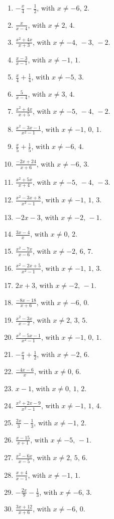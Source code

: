 \documentclass[11pt,oneside]{book}
\begin{document}
\begin{enumerate}[leftmargin=*,label=\textbf{N\arabic*.},itemsep=0.45\baselineskip]
\item $\displaystyle - \frac{x}{4} - \frac{1}{2}$, with $x\ne -6,\,2$.
\item $\displaystyle \frac{x}{x - 4}$, with $x\ne 2,\,4$.
\item $\displaystyle \frac{x^{2} + 4 x}{x + 3}$, with $x\ne -4,\,-3,\,-2$.
\item $\displaystyle \frac{x - 3}{x - 1}$, with $x\ne -1,\,1$.
\item $\displaystyle \frac{x}{4} + \frac{1}{4}$, with $x\ne -5,\,3$.
\item $\displaystyle \frac{5}{x - 4}$, with $x\ne 3,\,4$.
\item $\displaystyle \frac{x^{2} + 4 x}{x + 5}$, with $x\ne -5,\,-4,\,-2$.
\item $\displaystyle \frac{x^{2} - 3 x - 1}{x^{2} - 1}$, with $x\ne -1,\,0,\,1$.
\item $\displaystyle \frac{x}{5} + \frac{1}{5}$, with $x\ne -6,\,4$.
\item $\displaystyle \frac{- 2 x + 24}{x + 6}$, with $x\ne -6,\,3$.
\item $\displaystyle \frac{x^{2} + 5 x}{x + 4}$, with $x\ne -5,\,-4,\,-3$.
\item $\displaystyle \frac{x^{2} - 3 x + 8}{x^{2} - 1}$, with $x\ne -1,\,1,\,3$.
\item $\displaystyle - 2 x - 3$, with $x\ne -2,\,-1$.
\item $\displaystyle \frac{3 x - 4}{x}$, with $x\ne 0,\,2$.
\item $\displaystyle \frac{x^{2} - 7 x}{x - 6}$, with $x\ne -2,\,6,\,7$.
\item $\displaystyle \frac{x^{2} - 2 x + 5}{x^{2} - 1}$, with $x\ne -1,\,1,\,3$.
\item $\displaystyle 2 x + 3$, with $x\ne -2,\,-1$.
\item $\displaystyle \frac{- 8 x - 18}{x + 6}$, with $x\ne -6,\,0$.
\item $\displaystyle \frac{x^{2} - 3 x}{x - 2}$, with $x\ne 2,\,3,\,5$.
\item $\displaystyle \frac{x^{2} - 5 x - 1}{x^{2} - 1}$, with $x\ne -1,\,0,\,1$.
\item $\displaystyle - \frac{x}{4} + \frac{1}{2}$, with $x\ne -2,\,6$.
\item $\displaystyle \frac{- 4 x - 6}{x}$, with $x\ne 0,\,6$.
\item $\displaystyle x - 1$, with $x\ne 0,\,1,\,2$.
\item $\displaystyle \frac{x^{2} + 2 x - 9}{x^{2} - 1}$, with $x\ne -1,\,1,\,4$.
\item $\displaystyle \frac{2 x}{3} - \frac{1}{3}$, with $x\ne -1,\,2$.
\item $\displaystyle \frac{x - 15}{x + 1}$, with $x\ne -5,\,-1$.
\item $\displaystyle \frac{x^{2} - 6 x}{x - 5}$, with $x\ne 2,\,5,\,6$.
\item $\displaystyle \frac{x + 4}{x - 1}$, with $x\ne -1,\,1$.
\item $\displaystyle - \frac{2 x}{9} - \frac{1}{3}$, with $x\ne -6,\,3$.
\item $\displaystyle \frac{3 x + 12}{x + 6}$, with $x\ne -6,\,0$.
\end{enumerate}
\end{document}

